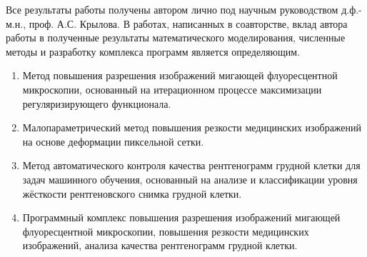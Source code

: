 {\begin{refsection}
    \end{refsection}%
}


{\contribution} 

Все результаты работы получены автором лично под научным руководством д.ф.-м.н., проф. А.С. Крылова. В работах, написанных в соавторстве, вклад автора работы в полученные результаты математического моделирования, численные методы и разработку комплекса программ является определяющим.

{}

\begin {enumerate}[beginpenalty=10000]
	\item Метод повышения разрешения изображений мигающей флуоресцентной микроскопии, основанный на итерационном процессе максимизации регуляризирующего функционала.
	
	\item Малопараметрический метод повышения резкости медицинских изображений на основе деформации пиксельной сетки.
	
	\item Метод автоматического контроля качества рентгенограмм грудной клетки для задач машинного обучения, основанный на анализе и классификации уровня жёсткости рентгеновского снимка грудной клетки.
	
	\item Программный комплекс повышения разрешения изображений мигающей флуоресцентной микроскопии, повышения резкости медицинских изображений, анализа качества рентгенограмм грудной клетки.
\end {enumerate}


